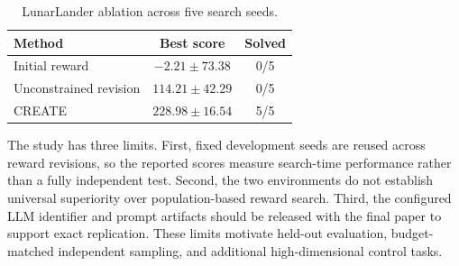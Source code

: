 \begin{table}[t]
\caption{LunarLander ablation across five search seeds.}
\label{tab:ablation}
\centering
\scriptsize
\setlength{\tabcolsep}{3.3pt}
\begin{tabular}{lcc}
\toprule
Method & Best score & Solved \\
\midrule
Initial reward & $-2.21\pm73.38$ & 0/5 \\
Unconstrained revision & $114.21\pm42.29$ & 0/5 \\
CREATE & $228.98\pm16.54$ & 5/5 \\
\bottomrule
\end{tabular}
\end{table}

The study has three limits. First, fixed development seeds are reused across reward revisions, so the reported scores measure search-time performance rather than a fully independent test. Second, the two environments do not establish universal superiority over population-based reward search. Third, the configured LLM identifier and prompt artifacts should be released with the final paper to support exact replication. These limits motivate held-out evaluation, budget-matched independent sampling, and additional high-dimensional control tasks.
